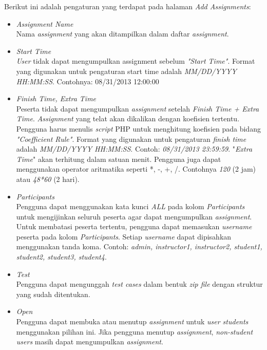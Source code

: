 Berikut ini adalah pengaturan yang terdapat pada halaman \textit{Add Assignments}:
\begin{itemize}
	\item \textit{Assignment Name} \\
	Nama \textit{assignment} yang akan ditampilkan dalam daftar \textit{assignment}.
	
	\item \textit{Start Time} \\
	\textit{User} tidak dapat mengumpulkan assignment sebelum \textit{"Start Time"}. Format yang digunakan untuk pengaturan start time adalah \textit{MM/DD/YYYY HH:MM:SS}. Contohnya: 08/31/2013 12:00:00
	
	\item \textit{Finish Time, Extra Time} \\
	Peserta tidak dapat mengumpulkan \textit{assignment} setelah \textit{Finish Time + Extra Time}. \textit{Assignment} yang telat akan dikalikan dengan koefisien tertentu. Pengguna harus menulis \textit{script} PHP untuk menghitung koefisien pada bidang \textit{"Coefficient Rule"}. Format yang digunakan untuk pengaturan \textit{finish time} adalah \textit{MM/DD/YYYY HH:MM:SS}. Contoh: \textit{08/31/2013 23:59:59}. "\textit{Extra Time}" akan terhitung dalam satuan menit. Pengguna juga dapat menggunakan operator aritmatika seperti *, -, +, /. Contohnya \textit{120} (2 jam) atau \textit{48*60} (2 hari).
	
	\item \textit{Participants} \\
	Pengguna dapat menggunakan kata kunci \textit{ALL} pada kolom \textit{Participants} untuk mengijinkan seluruh peserta agar dapat mengumpulkan \textit{assignment}. Untuk membatasi peserta tertentu, pengguna dapat memasukan \textit{username} peserta pada kolom \textit{Participants}. Setiap \textit{username} dapat dipisahkan menggunakan tanda koma. Contoh: \textit{admin, instructor1, instructor2, student1, student2, student3, student4}.
	
	\item \textit{Test} \\
	Pengguna dapat mengunggah \textit{test cases} dalam bentuk \textit{zip file} dengan struktur yang sudah ditentukan.
	
	\item \textit{Open} \\
	Pengguna dapat membuka atau menutup \textit{assignment} untuk \textit{user students} menggunakan pilihan ini. Jika pengguna menutup \textit{assignment}, \textit{non-student users} masih dapat mengumpulkan \textit{assignment}.
	

\end{itemize}
